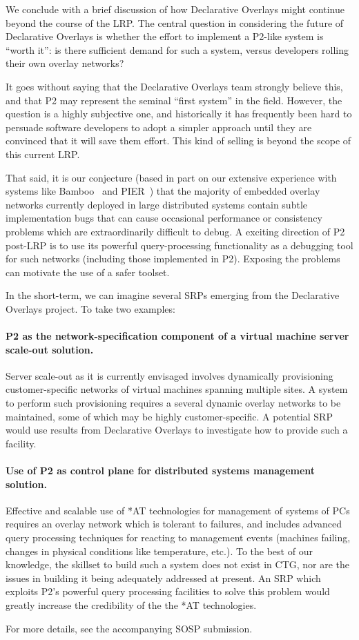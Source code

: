 \documentclass[twocolumn,10pt]{article}
\def\Sys{P2\xspace}
\def\Lrp{Declarative Overlays\xspace}
\begin{document}
We conclude with a brief discussion of how \Lrp might continue beyond
the course of the LRP.   The central question in considering the
future of \Lrp is whether the effort to implement a \Sys-like system
is ``worth it'': is there sufficient demand for such a system, versus
developers rolling their own overlay networks?

It goes without saying that the \Lrp team strongly believe this,
and that \Sys may represent the seminal ``first system'' in the
field.   However, the question is a highly subjective one, and
historically it has frequently been 
hard to persuade software developers to adopt a simpler approach until
they are convinced that it will save them effort.  This kind of
selling is beyond the scope of this current LRP. 

That said, it is our conjecture (based in part on our extensive
experience with systems like Bamboo~\cite{rhea_usenix_2004} and
PIER~\cite{pier-cidr}) that the majority of embedded overlay
networks currently deployed in large distributed systems contain
subtle implementation bugs that can cause occasional performance or
consistency problems which are extraordinarily difficult to debug.  A
exciting direction of \Sys post-LRP is to use its powerful
query-processing functionality as a debugging tool for such networks
(including those implemented in P2).  Exposing the problems can
motivate the use of a safer toolset. 

In the short-term, we can imagine several SRPs emerging from the \Lrp
project.  To take two examples: 

\paragraph{\Sys as the network-specification component of a virtual
  machine server scale-out solution.}  Server scale-out as it is
  currently envisaged involves dynamically provisioning
  customer-specific networks of virtual machines spanning multiple
  sites.   A system to perform such provisioning requires a several
  dynamic overlay networks to be maintained, some of which may be
  highly customer-specific.  A potential SRP would use results from
  \Lrp to investigate how to provide such a facility. 

\paragraph{Use of \Sys as control plane for distributed systems
  management solution.}  Effective and scalable use of *AT
  technologies for management of systems of PCs requires an overlay
  network which is tolerant to failures, and includes advanced query
  processing techniques for reacting to management events (machines
  failing, changes in physical conditions like temperature, etc.).  To
  the best of our knowledge, the skillset to build such a system does
  not exist in CTG, nor are the issues in building it being adequately
  addressed at present.  An SRP which exploits \Sys's powerful query
  processing facilities to solve this problem would greatly increase
  the credibility of the the *AT technologies. 

For more details, see the accompanying SOSP submission. 

 

\end{document}

